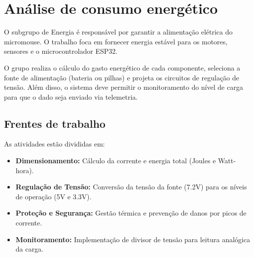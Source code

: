 

\section{Análise de consumo energético}

O subgrupo de Energia é responsável por garantir a alimentação elétrica do micromouse. O trabalho foca em fornecer energia estável para os motores, sensores e o microcontrolador ESP32.

O grupo realiza o cálculo do gasto energético de cada componente, seleciona a fonte de alimentação (bateria ou pilhas) e projeta os circuitos de regulação de tensão. Além disso, o sistema deve permitir o monitoramento do nível de carga para que o dado seja enviado via telemetria.

\subsection{Frentes de trabalho}
As atividades estão divididas em:
\begin{itemize}
    \item \textbf{Dimensionamento:} Cálculo da corrente e energia total (Joules e Watt-hora).
    \item \textbf{Regulação de Tensão:} Conversão da tensão da fonte (7.2V) para os níveis de operação (5V e 3.3V).
    \item \textbf{Proteção e Segurança:} Gestão térmica e prevenção de danos por picos de corrente.
    \item \textbf{Monitoramento:} Implementação de divisor de tensão para leitura analógica da carga.
\end{itemize}

